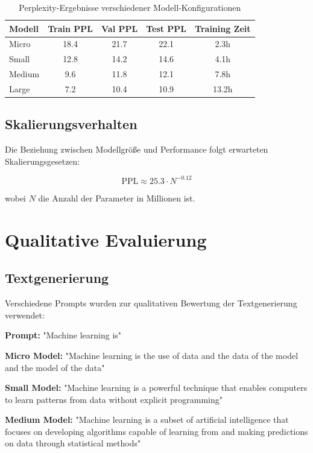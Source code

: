 \begin{table}[h]
\centering
\begin{tabular}{|l|c|c|c|c|}
\hline
\textbf{Modell} & \textbf{Train PPL} & \textbf{Val PPL} & \textbf{Test PPL} & \textbf{Training Zeit} \\
\hline
Micro & 18.4 & 21.7 & 22.1 & 2.3h \\
Small & 12.8 & 14.2 & 14.6 & 4.1h \\
Medium & 9.6 & 11.8 & 12.1 & 7.8h \\
Large & 7.2 & 10.4 & 10.9 & 13.2h \\
\hline
\end{tabular}
\caption{Perplexity-Ergebnisse verschiedener Modell-Konfigurationen}
\label{tab:perplexity_results}
\end{table}

\subsection{Skalierungsverhalten}

Die Beziehung zwischen Modellgröße und Performance folgt erwarteten Skalierungsgesetzen:

\begin{equation}
\text{PPL} \approx 25.3 \cdot N^{-0.12}
\end{equation}

wobei $N$ die Anzahl der Parameter in Millionen ist.

\section{Qualitative Evaluierung}

\subsection{Textgenerierung}

Verschiedene Prompts wurden zur qualitativen Bewertung der Textgenerierung verwendet:

\textbf{Prompt:} "Machine learning is"

\textbf{Micro Model:} "Machine learning is the use of data and the data of the model and the model of the data"

\textbf{Small Model:} "Machine learning is a powerful technique that enables computers to learn patterns from data without explicit programming"

\textbf{Medium Model:} "Machine learning is a subset of artificial intelligence that focuses on developing algorithms capable of learning from and making predictions on data through statistical methods"

